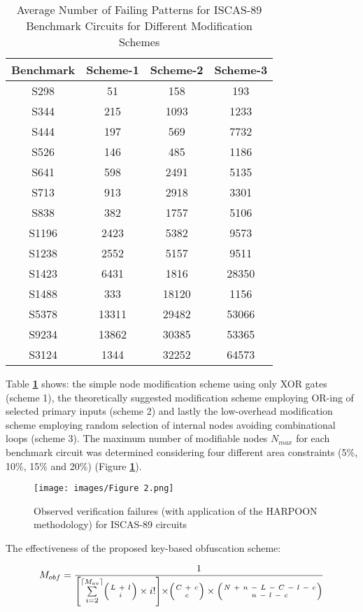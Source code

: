\documentclass{optica-article}
\begin{document}
\begin{table}[H]
    \centering
    \caption{Average Number of Failing Patterns for ISCAS-89 Benchmark Circuits for Different Modification Schemes}
    \begin{tabular}{|c|c|c|c|}
        \hline
        Benchmark & Scheme-1 & Scheme-2 & Scheme-3 \\\hline
        S298 & 51 & 158 & 193 \\\hline
        S344 & 215 & 1093 & 1233 \\\hline
        S444 & 197 & 569 & 7732 \\\hline
        S526 & 146 & 485 & 1186 \\\hline
        S641 & 598 & 2491 & 5135 \\\hline
        S713 & 913 & 2918 & 3301 \\\hline
        S838 & 382 & 1757 & 5106 \\\hline
        S1196 & 2423 & 5382 & 9573 \\\hline
        S1238 & 2552 & 5157 & 9511 \\\hline
        S1423 & 6431 & 1816 & 28350 \\\hline
        S1488 & 333 & 18120 & 1156 \\\hline
        S5378 & 13311 & 29482 & 53066 \\\hline
        S9234 & 13862 & 30385 & 53365 \\\hline
        S3124 & 1344 & 32252 & 64573 \\\hline
    \end{tabular}
    \label{tab:Table 1}
\end{table}


Table \textbf{\ref{tab:Table 1}} shows: the simple node modification scheme using only XOR gates (scheme 1), the theoretically suggested modification scheme employing OR-ing of selected primary inputs (scheme 2) and lastly the low-overhead modification scheme employing random selection of internal nodes avoiding combinational loops (scheme 3). The maximum number of modifiable nodes $N_{max}$ for each benchmark circuit was determined considering four different area constraints (5\%, 10\%, 15\% and 20\%) (Figure \textbf{\ref{fig:Figure 2}}).


\begin{figure}[H]
    \centering
    \texttt{[image: images/Figure 2.png]}
    \caption{Observed verification failures (with application of the HARPOON methodology) for ISCAS-89 circuits}
    \label{fig:Figure 2}
\end{figure}

\indent The effectiveness of the proposed key-based obfuscation scheme:

\begin{equation}
    \label{equation:5} 
    M_{obf}=\frac{1}{\Biggl[ \sum\limits_{i=2}^{\lceil M_{av}\rceil} \Bigl(\genfrac{}{}{0pt}{}{L\ +\ l}{i} \Bigr)\times i! \Biggl]\times\Bigl(\genfrac{}{}{0pt}{}{C\ +\ c}{c} \Bigr)\times\Bigl(\genfrac{}{}{0pt}{}{N\ +\ n\ -\ L\ -\ C\ -\ l\ -\ c
}{n\ -\ l\ -\ c} \Bigr)}
\end{equation}
\end{document}
